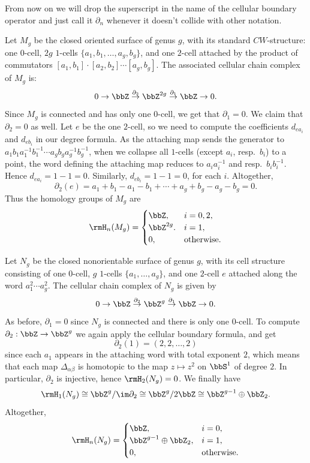 From now on we will drop the superscript in the name of the cellular boundary operator and just call it $\partial_n$ whenever it doesn't collide with other notation.


\begin{example}
    Let $M_g$ be the closed oriented surface of genus $g$, with its standard $CW$-structure: one $0$-cell, $2g$ $1$-cells $\{a_1,b_1,\ldots,a_g,b_g\}$, and one $2$-cell attached by the product of commutators $[a_1,b_1]\cdot[a_2,b_2]\cdots [a_g,b_g]$. The associated cellular chain complex of $M_g$ is:
    \[0\to \bbZ \overset{\partial_2}{\to}\bbZ^{2g}\overset{\partial_1}{\to}\bbZ \to 0.\]
    Since $M_g$ is connected and has only one $0$-cell, we get that $\partial_1=0$. We claim that $\partial_2=0$ as well. Let $e$ be the one $2$-cell, so we need to compute the coefficients $d_{ea_i}$ and $d_{eb_i}$ in our degree formula. As the attaching map sends the generator to $a_1b_1a_1^{-1}b_1^{-1}\cdots a_gb_ga_g^{-1}b_g^{-1}$, when we collapse all $1$-cells (except $a_i$, resp.~$b_i$) to a point, the word defining the attaching map reduces to $a_ia_i^{-1}$ and resp.~$b_ib_i^{-1}$. Hence $d_{ea_i}=1-1=0$. Similarly, $d_{eb_i}=1-1=0$, for each $i$. Altogether,
    \[\partial_2(e)=a_1+b_1-a_1-b_1+\cdots +a_g+b_g-a_g-b_g=0.\]
    Thus the homology groups of $M_g$ are
    \[\rmH_n(M_g)=\begin{cases}
        \bbZ, &i=0,2,\\
        \bbZ^{2g}.& i=1,\\
        0,&\text{otherwise}.
    \end{cases}\]
\end{example}

\begin{example}
    Let $N_g$ be the closed nonorientable surface of genus $g$, with its cell structure consisting of one $0$-cell, $g$ $1$-cells $\{a_1,\ldots,a_g\}$, and one $2$-cell $e$ attached along the word $a_1^2\cdots a_g^2$. The cellular chain complex of $N_g$ is given by
    \[0\to\bbZ \overset{\partial_2}{\to}\bbZ^g\overset{\partial_1}{\to}\bbZ \to 0.\]
    As before, $\partial_1=0$ since $N_g$ is connected and there is only one $0$-cell. To compute $\partial_2:\bbZ\to \bbZ^g$ we again apply the cellular boundary formula, and get 
    \[\partial_2(1)=(2,2,\ldots,2)\]
    since each $a_1$ appears in the attaching word with total exponent $2$, which means that each map $\Delta_{\alpha\beta}$ is homotopic to the map $z\mapsto z^2$ on $\bbS^1$ of degree $2$. In particular, $\partial_2$ is injective, hence $\rmH_2(N_g)=0$. We finally have
    \[\rmH_1(N_g)\cong \bbZ^g\slash\im \partial_2\cong \bbZ^g\slash 2\bbZ\cong \bbZ^{g-1}\oplus \bbZ_2.\]
    Altogether,
    \[\rmH_n(N_g)=\begin{cases}
        \bbZ,&i=0,\\
        \bbZ^{g-1}\oplus\bbZ_2,&i=1,\\
        0,&\text{otherwise}.
    \end{cases}\]
\end{example}

